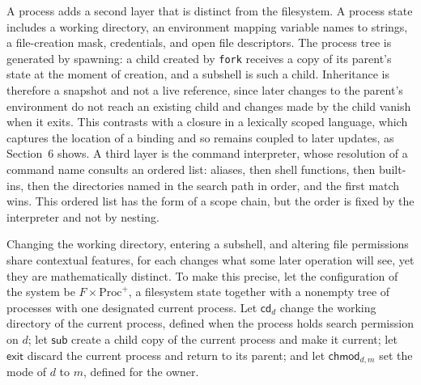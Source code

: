 A process adds a second layer that is distinct from the filesystem. A process state includes a working directory, an environment mapping variable names to strings, a file-creation mask, credentials, and open file descriptors. The process tree is generated by spawning: a child created by \texttt{fork} receives a copy of its parent's state at the moment of creation, and a subshell is such a child. Inheritance is therefore a snapshot and not a live reference, since later changes to the parent's environment do not reach an existing child and changes made by the child vanish when it exits. This contrasts with a closure in a lexically scoped language, which captures the location of a binding and so remains coupled to later updates, as Section~6 shows. A third layer is the command interpreter, whose resolution of a command name consults an ordered list: aliases, then shell functions, then built-ins, then the directories named in the search path in order, and the first match wins. This ordered list has the form of a scope chain, but the order is fixed by the interpreter and not by nesting.

Changing the working directory, entering a subshell, and altering file permissions share contextual features, for each changes what some later operation will see, yet they are mathematically distinct. To make this precise, let the configuration of the system be $F\times\mathrm{Proc}^{+}$, a filesystem state together with a nonempty tree of processes with one designated current process. Let $\mathsf{cd}_d$ change the working directory of the current process, defined when the process holds search permission on $d$; let $\mathsf{sub}$ create a child copy of the current process and make it current; let $\mathsf{exit}$ discard the current process and return to its parent; and let $\mathsf{chmod}_{d,m}$ set the mode of $d$ to $m$, defined for the owner.


